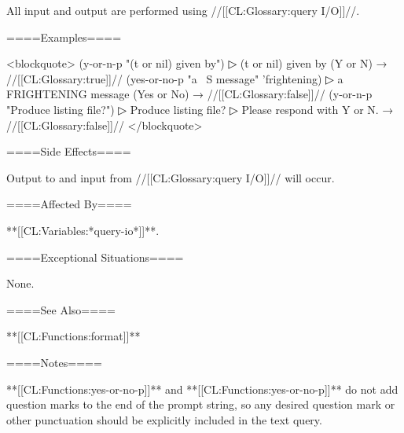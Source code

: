 All input and output are performed using //[[CL:Glossary:query I/O]]//.

====Examples====

<blockquote> (y-or-n-p "(t or nil) given by")
▷ (t or nil) given by (Y or N)  → //[[CL:Glossary:true]]// (yes-or-no-p "a ~S message" 'frightening)
▷ a FRIGHTENING message (Yes or No)  → //[[CL:Glossary:false]]// (y-or-n-p "Produce listing file?")
▷ Produce listing file?
▷ Please respond with Y or N.  → //[[CL:Glossary:false]]// </blockquote>

====Side Effects====

Output to and input from //[[CL:Glossary:query I/O]]// will occur.

====Affected By====

**[[CL:Variables:*query-io*]]**.

====Exceptional Situations====

None.

====See Also====

**[[CL:Functions:format]]**

====Notes====

**[[CL:Functions:yes-or-no-p]]** and **[[CL:Functions:yes-or-no-p]]** do not add question marks to the end of the prompt string, so any desired question mark or other punctuation should be explicitly included in the text query.

